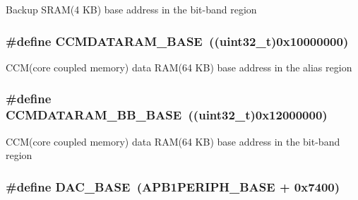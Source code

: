 Backup S\-R\-A\-M(4 K\-B) base address in the bit-\/band region \hypertarget{group___peripheral__memory__map_gabea1f1810ebeac402164b42ab54bcdf9}{
\subsubsection[{C\-C\-M\-D\-A\-T\-A\-R\-A\-M\-\_\-\-B\-A\-S\-E}]{\setlength{\rightskip}{0pt plus 5cm}\#define C\-C\-M\-D\-A\-T\-A\-R\-A\-M\-\_\-\-B\-A\-S\-E~((uint32\-\_\-t)0x10000000)}}\label{group___peripheral__memory__map_gabea1f1810ebeac402164b42ab54bcdf9}
C\-C\-M(core coupled memory) data R\-A\-M(64 K\-B) base address in the alias region \hypertarget{group___peripheral__memory__map_gaf98d1f99ecd952ee59e80b345d835bb0}{
\subsubsection[{C\-C\-M\-D\-A\-T\-A\-R\-A\-M\-\_\-\-B\-B\-\_\-\-B\-A\-S\-E}]{\setlength{\rightskip}{0pt plus 5cm}\#define C\-C\-M\-D\-A\-T\-A\-R\-A\-M\-\_\-\-B\-B\-\_\-\-B\-A\-S\-E~((uint32\-\_\-t)0x12000000)}}\label{group___peripheral__memory__map_gaf98d1f99ecd952ee59e80b345d835bb0}
C\-C\-M(core coupled memory) data R\-A\-M(64 K\-B) base address in the bit-\/band region \hypertarget{group___peripheral__memory__map_gad18d0b914c7f68cecbee1a2d23a67d38}{
\subsubsection[{D\-A\-C\-\_\-\-B\-A\-S\-E}]{\setlength{\rightskip}{0pt plus 5cm}\#define D\-A\-C\-\_\-\-B\-A\-S\-E~(A\-P\-B1\-P\-E\-R\-I\-P\-H\-\_\-\-B\-A\-S\-E + 0x7400)}}\label{group___peripheral__memory__map_gad18d0b914c7f68cecbee1a2d23a67d38}
